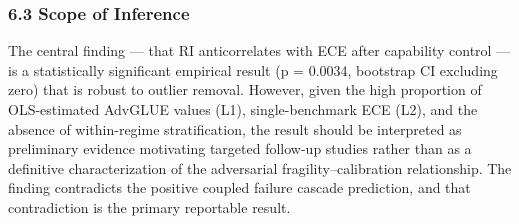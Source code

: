\subsubsection{6.3 Scope of Inference}

The central finding — that RI anticorrelates with ECE after capability control — is a statistically significant empirical result (p = 0.0034, bootstrap CI excluding zero) that is robust to outlier removal. However, given the high proportion of OLS-estimated AdvGLUE values (L1), single-benchmark ECE (L2), and the absence of within-regime stratification, the result should be interpreted as preliminary evidence motivating targeted follow-up studies rather than as a definitive characterization of the adversarial fragility–calibration relationship. The finding contradicts the positive coupled failure cascade prediction, and that contradiction is the primary reportable result.

